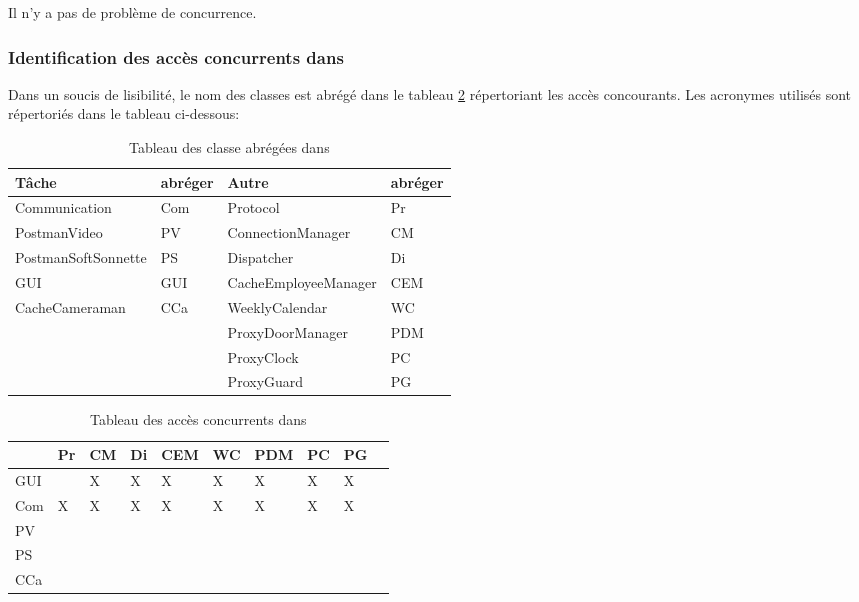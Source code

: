 Il n'y a pas de problème de concurrence.

\newpage
\subsubsection{Identification des accès concurrents dans \appliA}%

Dans un soucis de lisibilité, le nom des classes est abrégé dans le tableau \ref{tableau-acces-concurrents-3} répertoriant les accès concourants.
Les acronymes utilisés sont répertoriés dans le tableau ci-dessous:

\begin{table}[H]
    \centering
    \begin{tabularx}{\textwidth}{|X|p{2cm}|X|p{2cm}|}
      \hline 
         \textbf{Tâche}  &  \textbf{abréger} & \textbf{Autre} & \textbf{abréger} \\ 
        \hline
        Communication  & Com & Protocol &  Pr \\ 
        \hline
        PostmanVideo  & PV & ConnectionManager &  CM \\ 
        \hline
        PostmanSoftSonnette  & PS & Dispatcher &  Di \\ 
        \hline
        GUI  & GUI & CacheEmployeeManager  &  CEM \\ 
        \hline
        CacheCameraman  &  CCa & WeeklyCalendar  &  WC \\ 
        \hline
          &  & ProxyDoorManager   &  PDM \\ 
        \hline
          &  & ProxyClock   &  PC \\ 
        \hline
          &  & ProxyGuard   &  PG \\ 
        \hline 


    \end{tabularx}
    \caption{Tableau des classe abrégées dans \appliA}
    \label{tableau-abreger-classe-2}
  \end{table}

\begin{table}[H]
    \centering
    \begin{tabularx}{\textwidth}{|X|X|X|X|X|X|X|X|X|X|}
      \hline 
                 & Pr & CM & Di  & CEM  & WC & PDM & PC & PG \\ 
        \hline
            GUI  &    &  X &  X  &  X   &  X &  X  & X  & X  \\ 
        \hline
            Com  &  X &  X &  X  &  X   &  X &  X  & X  & X  \\ 
        \hline
            PV   &    &    &     &      &    &     &    &    \\ 
        \hline
            PS   &    &    &     &      &    &     &    &    \\ 
        \hline
            CCa  &    &    &     &      &    &     &    &    \\      
        \hline
    \end{tabularx}
    \caption{Tableau des accès concurrents dans \appliA}
    \label{tableau-acces-concurrents-3}
  \end{table}


